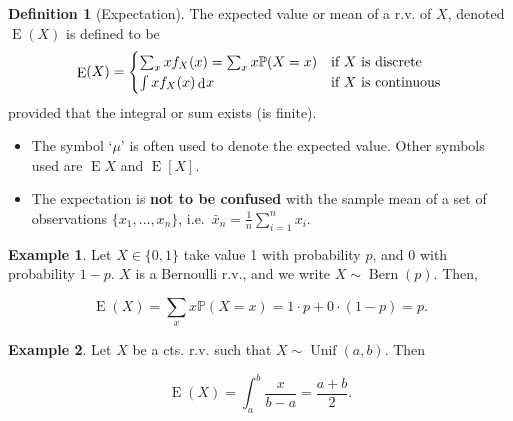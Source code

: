 \documentclass[
]{book}
\providecommand{\tightlist}{%
  \setlength{\itemsep}{0pt}\setlength{\parskip}{0pt}}
\DeclareMathOperator{\E}{E}
\DeclareMathOperator{\Bern}{Bern}
\DeclareMathOperator{\Unif}{Unif}
\newcommand{\bbP}{\mathbb{P}}
\DeclareMathOperator{\dd}{d}
\newcommand{\dint}{\dd\hspace{0.5pt}\!}
\theoremstyle{definition}
\newtheorem{definition}{Definition}[chapter]
\theoremstyle{definition}
\newtheorem{example}{Example}[chapter]
\theoremstyle{definition}
\theoremstyle{definition}
\theoremstyle{remark}
\begin{document}
\begin{definition}[Expectation]
The expected value or mean of a r.v. of $X$, denoted $\E(X)$ is defined to be
\[
\E(X) = \begin{cases}
  \sum_x x f_X(x) = \sum_x x \bbP(X=x) &\text{if $X$ is discrete} \\
  \int x f_X(x) \dint x &\text{if $X$ is continuous} \\  
\end{cases}
\]
provided that the integral or sum exists (is finite). 
\end{definition}

\begin{itemize}
\tightlist
\item
  The symbol `\(\mu\)' is often used to denote the expected value. Other symbols used are \(\E X\) and \(\E[X]\).
\item
  The expectation is \textbf{not to be confused} with the sample mean of a set of observations \(\{x_1,\dots,x_n \}\), i.e.~\(\bar x_n = \frac{1}{n} \sum_{i=1}^n x_i\).
\end{itemize}

\begin{example}
Let \(X \in \{0,1\}\) take value 1 with probability \(p\), and 0 with probability \(1-p\).
\(X\) is a Bernoulli r.v., and we write \(X \sim \Bern(p)\).
Then,

\[
\E(X) = \sum_x x\bbP(X = x) = 1\cdot p + 0 \cdot (1-p) = p.
\]
\end{example}

\begin{example}
Let \(X\) be a cts. r.v. such that \(X\sim\Unif(a,b)\). Then

\[
\E(X) = \int_a^b  \frac{x}{b-a} = \frac{a+b}{2}.
\]
\end{example}
\end{document}
